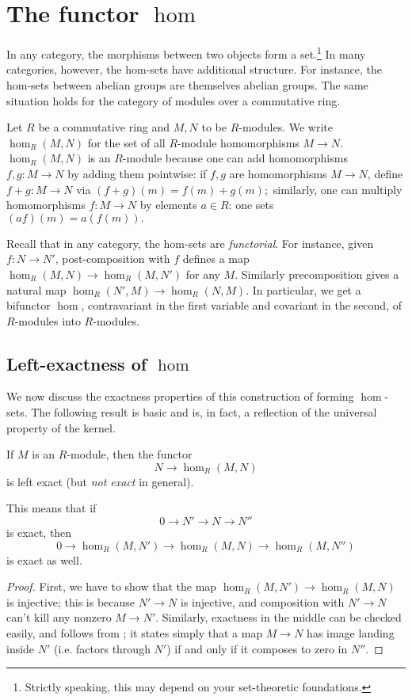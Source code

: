 \section{The functor $\hom$}

In any category, the morphisms between two objects form a
set.\footnote{Strictly speaking, this may depend on your set-theoretic
foundations.} In many
categories, however, the hom-sets have additional structure. For instance,
the hom-sets
between abelian groups are themselves abelian groups. The same situation holds
for the category of modules over a commutative ring.


\begin{definition}
Let $R$ be a commutative ring and $M,N$ to be $R$-modules.  We write
$\hom_R(M,N)$ for
the set of all $R$-module homomorphisms $M \to N$.
 $\hom_R(M,N)$ is an $R$-module because one can add homomorphisms $f,g: M
\to N$ by adding
them pointwise: if $f,g$ are homomorphisms $M \to N$, define $f+g: M \to N$ via
\( (f+g)(m) = f(m)+g(m);  \)
similarly, one can multiply homomorphisms $f: M \to N$ by elements  $ a \in
R$: one sets
\( (af)(m) = a(f(m)).  \)
\end{definition}

Recall that in any category, the hom-sets are \emph{functorial}. For instance,
given $f: N \to N'$, post-composition with $f$ defines a map $\hom_R(M,N) \to
\hom_R(M,N')$ for any $M$.
Similarly precomposition gives  a natural map $\hom_R(N', M) \to \hom_R(N, M)$.
In particular, we get a bifunctor $\hom$, contravariant in the first variable
and covariant in the second, of $R$-modules into $R$-modules.

\subsection{Left-exactness of $\hom$}

We now discuss the exactness properties of this construction of forming
$\hom$-sets. The following result is basic and is, in fact, a reflection of
the universal property of the kernel.
\begin{proposition} \label{homcovleftexact}
If $M$ is an $R$-module, then the functor
\[ N \to \hom_R(M,N)  \]
is left exact (but \emph{not exact} in general).
\end{proposition}
This means that if
\[ 0 \to N' \to N \to N''  \]
is exact,
then
\[ 0 \to \hom_R(M, N') \to \hom_R(M, N) \to \hom_R(M, N'')  \]
is exact as well.

\begin{proof}
 First, we have to show that the map
$\hom_R(M,N') \to \hom_R(M,N)$ is injective; this is because $N' \to N$ is
injective, and composition with $N' \to N$ can't kill any nonzero $M \to N'$.
Similarly, exactness in the middle can be checked easily, and follows from
; it states simply that a map $M \to N$ has
image landing inside $N'$ (i.e. factors through $N'$) if and only if it
composes to zero in $N''$.
\end{proof}

